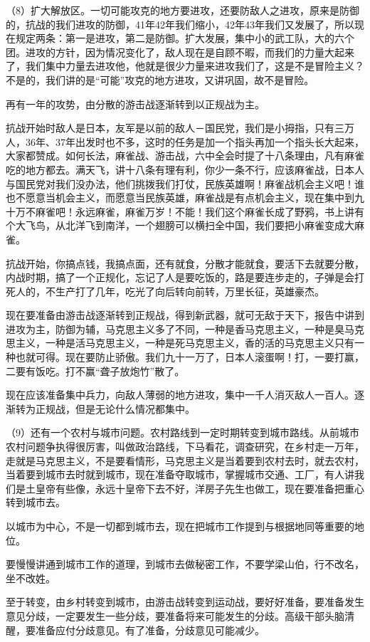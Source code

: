 （8）扩大解放区。一切可能攻克的地方要进攻，还要防敌人之进攻，原来是防御的，抗战的我们进攻的防御，41年42年我们缩小，42年43年我们又发展了，所以现在规定两条：第一是进攻，第二是防御。扩大发展，集中小的武工队，大的六个团。进攻的方针，因为情况变化了，敌人现在是自顾不暇，而我们的力量大起来了，我们集中力量去进攻他，他就是很少力量来进攻我们了，这是不是冒险主义？不是的，我们讲的是“可能”攻克的地方进攻，又讲巩固，故不是冒险。

再有一年的攻势，由分散的游击战逐渐转到以正规战为主。

抗战开始时敌人是日本，友军是以前的敌人－国民党，我们是小拇指，只有三万人，36年、37年出发时也不多，这时的任务是加一个指头再加一个指头长大起来，大家都赞成。如何长法，麻雀战、游击战，六中全会时提了十八条理由，凡有麻雀吃的地方都去。满天飞，讲十八条有理有利，你少一条不行，应该麻雀战，日本人与国民党对我们没办法，他们挑拨我们打仗，民族英雄啊！麻雀战机会主义吧！谁也不愿意当机会主义，而愿意当民族英雄，麻雀战是有点机会主义，现在集中到九十万不麻雀吧！永远麻雀，麻雀万岁！不能！我们这个麻雀长成了野鸦，书上讲有个大飞鸟，从北洋飞到南洋，一个翅膀可以横扫全中国，我们要把小麻雀变成大麻雀。

抗战开始，你搞点钱，我搞点面，还有就食，分散才能就食，要活下去就要分散，内战时期，搞了一个正规化，忘记了人是要吃饭的，路是要连步走的，子弹是会打死人的，不生产打了几年，吃光了向后转向前转，万里长征，英雄豪杰。

现在要准备由游击战逐渐转到正规战，得到新武器，就可无敌于天下，报告中讲到进攻为主，防御为辅，马克思主义多了不同，一种是香马克思主义，一种是臭马克思主义，一种是活马克思主义，一种是死马克思主义，香的活的马克思主义只有一种也就可得。现在要防止骄傲。我们九十一万了，日本人滚蛋啊！打，一要打赢，二要有饭吃。打不赢“聋子放炮竹”散了。

现在应该准备集中兵力，向敌人薄弱的地方进攻，集中一千人消灭敌人一百人。逐渐转为正规战，但是无论什么情况都集中。

（9）还有一个农村与城市问题。农村路线到一定时期转变到城市路线。从前城市农村问题争执得很厉害，叫做政治路线，下马看花，调查研究，在乡村走一万年，走就是马克思主义，不是要看情形，马克思主义是当着要到农村去时，就去农村，当着要到城市去时就到城市，现在准备夺取城市，掌握城市交通、工厂，有人讲我们是土皇帝有些像，永远十皇帝下去不好，洋房子先生也做工，现在要准备把重心转到城市去。

以城市为中心，不是一切都到城市去，现在把城市工作提到与根据地同等重要的地位。

要慢慢讲通到城市工作的道理，到城市去做秘密工作，不要学梁山伯，行不改名，坐不改姓。

至于转变，由乡村转变到城市，由游击战转变到运动战，要好好准备，要准备发生意见分歧，一定要发生一些分歧，要准备将来可能发生的分歧。高级干部头脑清醒，要准备应付分歧意见。有了准备，分歧意见可能减少。

